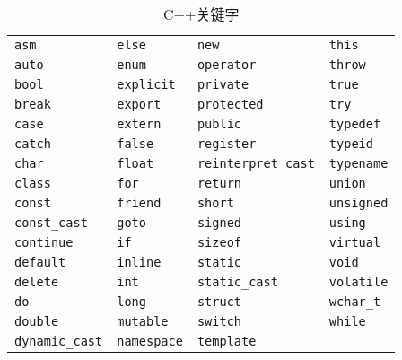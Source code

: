 \lstset{language=c++}
\begin{frame}[fragile]\ft{\secname}
\begin{table}
	\centering
	\caption{C++关键字}
	\begin{tabular}{p{2cm}p{2cm}p{2.5cm}p{2cm}}\hline
          \lstinline|asm|         & \lstinline|else|     & \lstinline|new|             & \lstinline|this|     \\
          \lstinline|auto|        & \lstinline|enum|     & \lstinline|operator|        & \lstinline|throw|    \\
          \lstinline|bool|        & \lstinline|explicit| & \lstinline|private|         & \lstinline|true|     \\
          \lstinline|break|       & \lstinline|export|   & \lstinline|protected|       & \lstinline|try|      \\
          \lstinline|case|        & \lstinline|extern|   & \lstinline|public|          & \lstinline|typedef|  \\
          \lstinline|catch|       & \lstinline|false|    & \lstinline|register|        & \lstinline|typeid|   \\
          \lstinline|char|        & \lstinline|float|    & \lstinline|reinterpret_cast|& \lstinline|typename| \\
          \lstinline|class|       & \lstinline|for|      & \lstinline|return|          & \lstinline|union|    \\
          \lstinline|const|       & \lstinline|friend|   & \lstinline|short|           & \lstinline|unsigned| \\
          \lstinline|const_cast|  & \lstinline|goto|     & \lstinline|signed|          & \lstinline|using|    \\  
          \lstinline|continue|    & \lstinline|if|       & \lstinline|sizeof|          & \lstinline|virtual|  \\  
          \lstinline|default|     & \lstinline|inline|   & \lstinline|static|          & \lstinline|void|     \\  		
          \lstinline|delete|      & \lstinline|int|      & \lstinline|static_cast|     & \lstinline|volatile| \\ 
          \lstinline|do|          & \lstinline|long|     & \lstinline|struct|          & \lstinline|wchar_t|  \\
          \lstinline|double|      & \lstinline|mutable|  & \lstinline|switch|          & \lstinline|while|    \\
          \lstinline|dynamic_cast|& \lstinline|namespace|& \lstinline|template|        &                      \\\hline		
        \end{tabular}
\end{table}
\end{frame}









